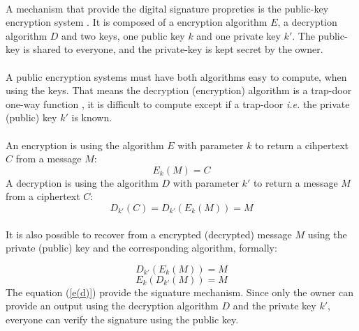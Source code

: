 \documentclass[letterpaper]{article}
\begin{document}
\paragraph{}
A mechanism that provide the digital signature propreties is the public-key
encryption system \cite{RSA}. It is composed of a encryption algorithm $E$, a
decryption algorithm $D$ and two keys, one public key $k$ and one private key
$k'$. The public-key is shared to everyone, and the private-key is
kept secret by the owner.

\paragraph{}
A public encryption systems must have both algorithms
easy to compute, when using the keys. That means the decryption (encryption)
algorithm is a trap-door one-way function \cite{DiffieHellman}, it
is difficult to compute except if a trap-door \textit{i.e.}
the private (public) key $k'$ is known.
\paragraph{}

An encryption is using the algorithm $E$ with parameter $k$
to return a cihpertext $C$ from a message $M$:
\begin{equation}
    E_k(M) = C
\end{equation}
A decryption is using the algorithm $D$ with parameter $k'$
to return a message $M$ from a ciphertext $C$:
\begin{equation}
    D_{k'}(C) = D_{k'}(E_k(M)) =  M
\end{equation}

\paragraph{}
It is also possible to recover from a encrypted
(decrypted) message $M$ using the private (public) key and the
corresponding algorithm, formally:

\begin{equation}
    D_{k'}(E_k(M)) = M
\end{equation}
\begin{equation}
    \label{e(d)}
    E_{k}(D_{k'}(M)) = M
\end{equation}
The equation (\ref{e(d)}) provide the signature mechanism. Since only
the owner can provide an output using the decryption algorithm $D$ and
the private key $k'$, everyone can verify the signature using the public key.
\end{document}
